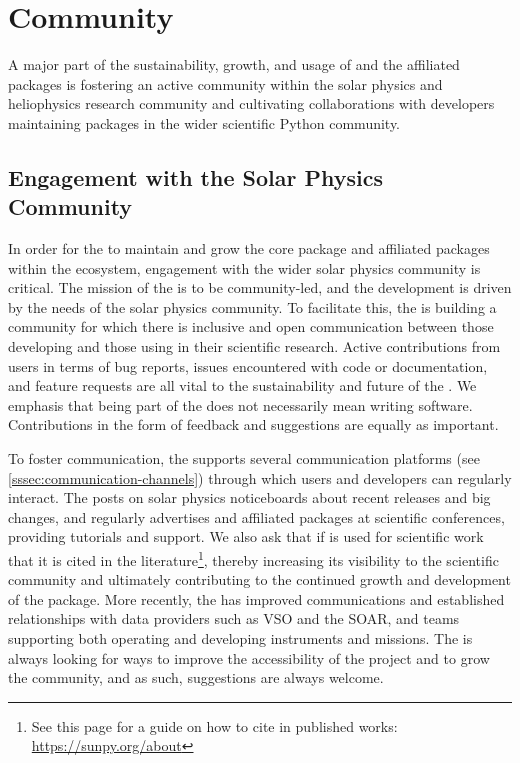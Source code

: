 \section{Community}
\label{sec:community}

A major part of the sustainability, growth, and usage of \sunpypkg and the affiliated packages is fostering an active community within the solar physics and heliophysics research community and cultivating collaborations with developers maintaining packages in the wider scientific Python community.

\subsection{Engagement with the Solar Physics Community}
\label{ssec:engagement-with-the-solar-physics-community}

In order for the \sunpyproj to maintain and grow the \sunpypkg core package and affiliated packages within the ecosystem, engagement with the wider solar physics community is critical.
The mission of the \sunpyproj is to be community-led, and the development is driven by the needs of the solar physics community.
To facilitate this, the \sunpyproj is building a community for which there is inclusive and open communication between those developing \sunpypkg and those using \sunpypkg in their scientific research.
Active contributions from users in terms of bug reports, issues encountered with code or documentation, and feature requests are all vital to the sustainability and future of the \sunpyproj.
We emphasis that being part of the \sunpyproj does not necessarily mean writing software. Contributions in the form of feedback and suggestions are equally as important.

To foster communication, the \sunpyproj supports several communication platforms (see \autoref{sssec:communication-channels}) through which users and developers can regularly interact.
The \sunpyproj posts on solar physics noticeboards about recent releases and big changes, and regularly advertises \sunpypkg and affiliated packages at scientific conferences, providing tutorials and support.
We also ask that if \sunpypkg is used for scientific work that it is cited in the literature\footnote{See this page for a guide on how to cite \sunpypkg in published works: \url{https://sunpy.org/about}}, thereby increasing its visibility to the scientific community and ultimately contributing to the continued growth and development of the package.
More recently, the \sunpyproj has improved communications and established relationships with data providers such as VSO and the SOAR, and teams supporting both operating and developing instruments and missions.
The \sunpyproj is always looking for ways to improve the accessibility of the project and to grow the community, and as such, suggestions are always welcome.

